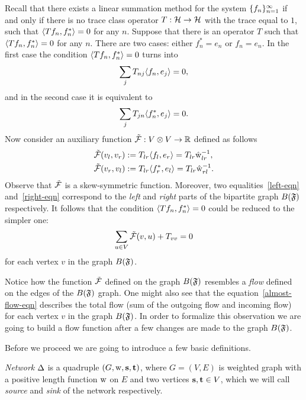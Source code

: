 \documentclass[12pt]{article}
\begin{document}
    Recall that there exists a linear summation method for the system $\seq{f}$
      if and only if there is no trace class operator $T: \cal{H} \to \cal{H}$ with the trace equal to $1$,
      such that $\inner{Tf_n}{f_n^*} = 0$ for any $n$.
    Suppose that there is an operator $T$ such that $\inner{Tf_n}{f_n^*} = 0$ for any $n$.
    There are two cases: either $f^*_n = e_n$ or $f_n = e_n$.
    In the first case the condition $\inner{Tf_n}{f_n^*} = 0$ turns into
    \begin{equation}
        \label{left-eqn}
        \sum_j T_{nj} \inner{f_n}{e_j} = 0,
    \end{equation}
    and in the second case it is equivalent to
    \begin{equation}
        \label{right-eqn}
        \sum_j T_{jn} \inner{f^*_n}{e_j} = 0.
    \end{equation}
    Now consider an auxiliary function $\flowsgn: V \otimes V \to \mathbb{R}$ defined as follows
    \begin{align*}
        &\flowsgn(v_l, v_r) := T_{lr} \inner{f_l}{e_r} = T_{lr} \wt_{lr}^{-1},\\
        &\flowsgn(v_r, v_l) := T_{lr} \inner{f^*_r}{e_l} = T_{lr} \wt_{rl}^{-1}.
    \end{align*}
    Observe that $\flowsgn$ is a skew-symmetric function.
    Moreover, two equalities~\eqref{left-eqn} and~\eqref{right-eqn} correspond to the \emph{left} and \emph{right}
      parts of the bipartite graph $B(\fsys)$ respectively.
    It follows that the condition $\inner{Tf_n}{f_n^*} = 0$ could be reduced to the simpler one:
    \begin{equation}
      \label{almost-flow-eqn}
      \sum_{u \in V} \flowsgn(v, u) + T_{vv} = 0
    \end{equation}
      for each vertex $v$ in the graph $B(\fsys)$.
    \begin{remark}
      Notice how the function $\flowsgn$ defined on the graph $B(\fsys)$ resembles
        a \emph{flow} defined on the edges of the $B(\fsys)$ graph.
      One might also see that the equation~\eqref{almost-flow-eqn} describes the total flow (sum of the outgoing flow and incoming flow) 
        for each vertex $v$ in the graph $B(\fsys)$.
      In order to formalize this observation we are going to build a flow function
        after a few changes are made to the graph $B(\fsys)$.
    \end{remark}
    Before we proceed we are going to introduce a few basic definitions.
    \begin{definition}
        \emph{Network} $\net$ is a quadruple $(G, \wtp, \source, \sink)$, where $G = (V, E)$ is weighted graph
        with a positive length function $\wtp$ on $E$ and two vertices $\source, \sink \in V$, which
        we will call \emph{source} and \emph{sink} of the network respectively.
    \end{definition}
\end{document}
